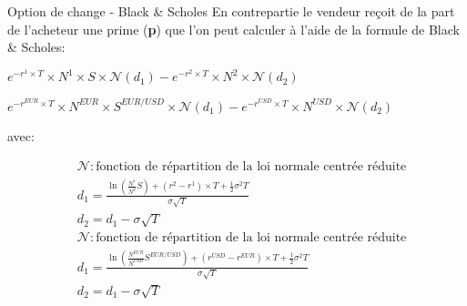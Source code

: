 \documentclass{beamer}
\begin{document}
\begin{frame}{Option de change - Black \& Scholes }
En contrepartie le vendeur reçoit de la part de l'acheteur une prime (\textbf{p})  que l'on peut calculer à l'aide de la formule de Black \& Scholes:\\
\vspace{0.5cm}
\begin{overprint}
\begin{center}
$e^{-r^1 \times T} \times N^1 \times S \times \mathcal{N}(d_1)-e^{-r^2 \times T} \times N^2 \times \mathcal{N}(d_2)$
\end{center}
\begin{center}
$e^{-r^{EUR} \times T} \times N^{EUR} \times S^{EUR/USD} \times \mathcal{N}(d_1)-e^{-r^{USD} \times T} \times N^{USD} \times \mathcal{N}(d_2)$
\end{center}
\end{overprint}
avec:\\
\begin{overprint}
\[
\begin{split}
&\mathcal{N} : \text{fonction de répartition de la loi normale centrée réduite}\\
&d_1=\frac{\ln\left( \frac{N^1}{N^2} S \right)+(r^2-r^1) \times T+\frac{1}{2}\sigma^2 T}{\sigma\sqrt{T}}\\
&d_2=d_1-\sigma\sqrt{T}
\end{split}
\]
\[
\begin{split}
&\mathcal{N} : \text{fonction de répartition de la loi normale centrée réduite}\\
&d_1=\frac{\ln\left( \frac{N^{EUR}}{N^{USD}} S^{EUR/USD} \right)+(r^{USD}-r^{EUR}) \times T+\frac{1}{2}\sigma^2 T}{\sigma\sqrt{T}}\\
&d_2=d_1-\sigma\sqrt{T}
\end{split}
\]
\end{overprint}
\end{frame}
\end{document}

